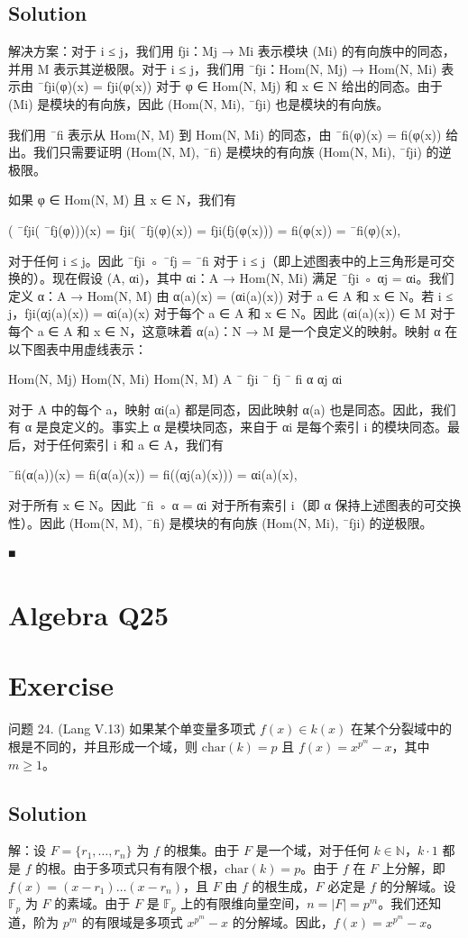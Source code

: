 \documentclass[12pt]{book}
\begin{document}
\subsection*{Solution}
解决方案：对于 i ≤ j，我们用 fji：Mj → Mi 表示模块 (Mi) 的有向族中的同态，并用 M 表示其逆极限。对于 i ≤ j，我们用 ¯fji：Hom(N, Mj) → Hom(N, Mi) 表示由 ¯fji(φ)(x) = fji(φ(x)) 对于 φ ∈ Hom(N, Mj) 和 x ∈ N 给出的同态。由于 (Mi) 是模块的有向族，因此 (Hom(N, Mi), ¯fji) 也是模块的有向族。

我们用 ¯fi 表示从 Hom(N, M) 到 Hom(N, Mi) 的同态，由 ¯fi(φ)(x) = fi(φ(x)) 给出。我们只需要证明 (Hom(N, M), ¯fi) 是模块的有向族 (Hom(N, Mi), ¯fji) 的逆极限。

如果 φ ∈ Hom(N, M) 且 x ∈ N，我们有

( ¯fji( ¯fj(φ)))(x) = fji( ¯fj(φ)(x)) = fji(fj(φ(x))) = fi(φ(x)) = ¯fi(φ)(x),

对于任何 i ≤ j。因此 ¯fji ◦ ¯fj = ¯fi 对于 i ≤ j（即上述图表中的上三角形是可交换的）。现在假设 (A, αi)，其中 αi：A → Hom(N, Mi) 满足 ¯fji ◦ αj = αi。我们定义 α：A → Hom(N, M) 由 α(a)(x) = (αi(a)(x)) 对于 a ∈ A 和 x ∈ N。若 i ≤ j，fji(αj(a)(x)) = αi(a)(x) 对于每个 a ∈ A 和 x ∈ N。因此 (αi(a)(x)) ∈ M 对于每个 a ∈ A 和 x ∈ N，这意味着 α(a)：N → M 是一个良定义的映射。映射 α 在以下图表中用虚线表示：

Hom(N, Mj)
Hom(N, Mi)
Hom(N, M)
A
¯
fji
¯
fj
¯
fi
α
αj
αi

对于 A 中的每个 a，映射 αi(a) 都是同态，因此映射 α(a) 也是同态。因此，我们有 α 是良定义的。事实上 α 是模块同态，来自于 αi 是每个索引 i 的模块同态。最后，对于任何索引 i 和 a ∈ A，我们有

¯fi(α(a))(x) = fi(α(a)(x)) = fi((αj(a)(x))) = αi(a)(x),

对于所有 x ∈ N。因此 ¯fi ◦ α = αi 对于所有索引 i（即 α 保持上述图表的可交换性）。因此 (Hom(N, M), ¯fi) 是模块的有向族 (Hom(N, Mi), ¯fji) 的逆极限。

■
\newpage
\section{Algebra Q25}
\section*{Exercise}
问题 24. (Lang V.13) 如果某个单变量多项式 $f(x) \in k(x)$ 在某个分裂域中的根是不同的，并且形成一个域，则 $\text{char}(k) = p$ 且 $f(x) = x^{p^m} - x$，其中 $m \ge 1$。



\subsection*{Solution}
解：设 $F = \{r_1, \dots, r_n\}$ 为 $f$ 的根集。由于 $F$ 是一个域，对于任何 $k \in \mathbb{N}$，$k \cdot 1$ 都是 $f$ 的根。由于多项式只有有限个根，$\text{char}(k) = p$。由于 $f$ 在 $F$ 上分解，即 $f(x) = (x - r_1) \dots (x - r_n)$，且 $F$ 由 $f$ 的根生成，$F$ 必定是 $f$ 的分解域。设 $\mathbb{F}_p$ 为 $F$ 的素域。由于 $F$ 是 $\mathbb{F}_p$ 上的有限维向量空间，$n = |F| = p^m$。我们还知道，阶为 $p^m$ 的有限域是多项式 $x^{p^m} - x$ 的分解域。因此，$f(x) = x^{p^m} - x$。
\newpage
\end{document}
